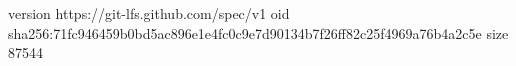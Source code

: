 version https://git-lfs.github.com/spec/v1
oid sha256:71fc946459b0bd5ac896e1e4fc0c9e7d90134b7f26ff82c25f4969a76b4a2c5e
size 87544
